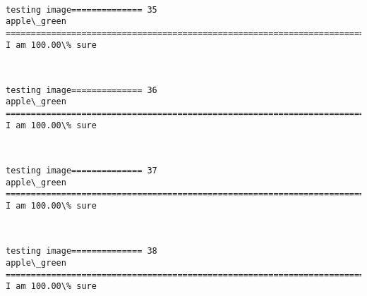 \documentclass[11pt]{article}
\begin{document}
    \begin{center}
    \end{center}
    { \hspace*{\fill} \\}
    
    \begin{Verbatim}[commandchars=\\\{\}]
testing image============== 35
apple\_green
============================================================================
I am 100.00\% sure

    \end{Verbatim}

    \begin{center}
    \end{center}
    { \hspace*{\fill} \\}
    
    \begin{Verbatim}[commandchars=\\\{\}]
testing image============== 36
apple\_green
============================================================================
I am 100.00\% sure

    \end{Verbatim}

    \begin{center}
    \end{center}
    { \hspace*{\fill} \\}
    
    \begin{Verbatim}[commandchars=\\\{\}]
testing image============== 37
apple\_green
============================================================================
I am 100.00\% sure

    \end{Verbatim}

    \begin{center}
    \end{center}
    { \hspace*{\fill} \\}
    
    \begin{Verbatim}[commandchars=\\\{\}]
testing image============== 38
apple\_green
============================================================================
I am 100.00\% sure

    \end{Verbatim}
\end{document}
